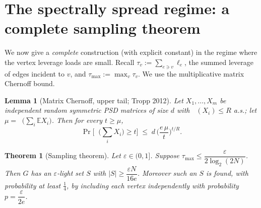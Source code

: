 \documentclass[12pt]{article}
\DeclareMathOperator*{\lammax}{\lambda_{\max}}
\newcommand{\eps}{\varepsilon}
\newtheorem{theorem}{Theorem}
\newtheorem{lemma}{Lemma}
\theoremstyle{definition}
\begin{document}
\section{The spectrally spread regime: a complete sampling theorem}

We now give a \emph{complete} construction (with explicit constant) in the
regime where the vertex leverage loads are small. Recall
$\tau_v:=\sum_{e\ni v}\ell_e$, the summed leverage of edges incident to $v$, and
$\tau_{\max}:=\max_{v}\tau_v$. We use the multiplicative matrix Chernoff bound.

\begin{lemma}[Matrix Chernoff, upper tail; Tropp 2012]\label{lem:tropp}
Let $X_1,\dots,X_m$ be independent random symmetric PSD matrices of size $d$ with
$\lammax(X_i)\le R$ a.s.; let $\mu=\lammax\!\big(\sum_i\mathbb E X_i\big)$. Then
for every $t\ge\mu$,
\[
  \Pr\Big[\lammax\!\big(\textstyle\sum_i X_i\big)\ge t\Big]
  \;\le\; d\,\Big(\frac{e\,\mu}{t}\Big)^{t/R}.
\]
\end{lemma}

\begin{theorem}[Sampling theorem]\label{thm:sample}
Let $\eps\in(0,1]$. Suppose $\tau_{\max}\le\dfrac{\eps}{2\log_2(2N)}$. Then $G$
has an $\eps$-light set $S$ with $|S|\ge\dfrac{\eps N}{16e}$. Moreover such an $S$
is found, with probability at least $\tfrac14$, by including each vertex
independently with probability $p=\dfrac{\eps}{2e}$.
\end{theorem}
\end{document}
